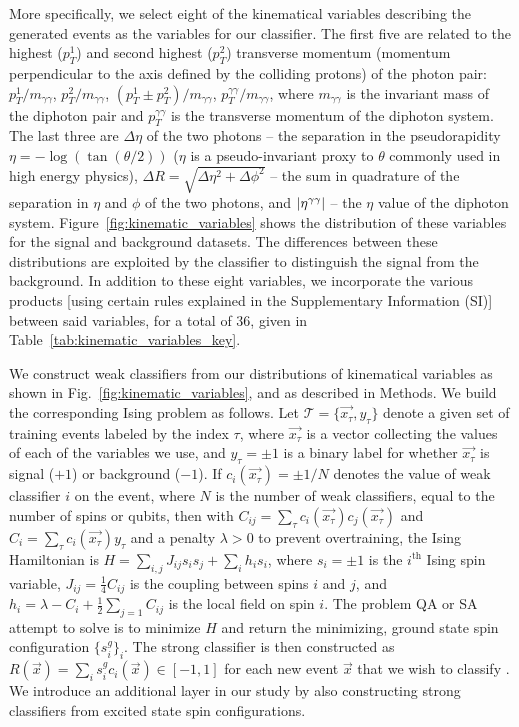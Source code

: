 \documentclass[fleqn,10pt]{wlscirep}
\newcommand{\mc}{\mathcal}
\begin{document}
More specifically, we select eight of the kinematical variables describing the generated events as the variables for our classifier. The first five are related to the highest ($p_T^1$) and second highest ($p_T^2$) transverse momentum (momentum perpendicular to the axis defined by the colliding protons) of the photon pair: 
 $p_T^1/m_{\gamma\gamma}$, $p_T^2/m_{\gamma\gamma}$, $(p_T^1\pm p_T^2)/m_{\gamma\gamma}$, $p_T^{\gamma\gamma}/m_{\gamma\gamma}$, where $m_{\gamma\gamma}$ is the invariant mass of the diphoton pair and $p_T^{\gamma\gamma}$ is the transverse momentum of the diphoton system. The last three are $\Delta\eta$ of the two photons -- the separation in the pseudorapidity  $\eta = -\log(\tan(\theta/2))$ ($\eta$ is a pseudo-invariant proxy to $\theta$ commonly used in high energy physics), $\Delta R = \sqrt{\Delta\eta^2+\Delta\phi^2}$ -- the sum in quadrature of the separation in $\eta$ and $\phi$ of the two photons, and $\abs{\eta^{\gamma\gamma}}$ -- the $\eta$ value of the diphoton system.
Figure~\ref{fig:kinematic_variables} shows the distribution of these variables for the signal and background datasets. The differences between these distributions are exploited by the classifier  to distinguish the signal from the background. In addition to these eight variables, we incorporate the various products [using certain rules explained in the Supplementary Information (SI)] between said variables, for a total of $36$, given in Table~\ref{tab:kinematic_variables_key}.
 

We construct weak classifiers from our distributions of kinematical variables as shown in Fig.~\ref{fig:kinematic_variables}, and as described in Methods. We build the corresponding Ising problem as follows\cite{Pudenz:2013kx}. Let $\mc{T} = \{\vec{x_\tau}, y_\tau\}$ denote a given set of training events labeled by the index ${\tau}$, where $\vec{x_\tau}$ is a vector collecting the values of each of the variables we use, and $y_\tau =\pm 1$ is a binary label for whether $\vec{x_\tau}$ is signal ($+1$) or background ($-1$).  If $c_i(\vec{x_\tau})=\pm 1/N$ denotes the value of weak classifier $i$ on the event, where $N$ is the number of weak classifiers, equal to the number of spins or qubits, then with $C_{ij} = \sum_\tau c_i(\vec{x_\tau})c_j(\vec{x_\tau})$ and $C_i = \sum_\tau c_i(\vec{x_\tau}) y_\tau$ and a penalty $\lambda>0$ to prevent overtraining, the Ising Hamiltonian is $H = \sum_{i,j} J_{ij} s_i s_j + \sum_i h_i  s_i$, where $s_i=\pm 1$ is the $i^\textrm{th}$ Ising spin variable, $J_{ij} = \frac{1}{4} C_{ij}$ is the coupling between spins $i$ and $j$, and $h_i =  \lambda-C_i+\frac{1}{2}\sum_{j=1} C_{ij}$ is the local field on spin $i$. The problem QA or SA attempt to solve is to minimize $H$ and return the minimizing, ground state spin configuration $\{s^g_i\}_i$. The strong classifier is then constructed as $R(\vec{x}) = \sum_i s^g_i c_i(\vec{x})\in[-1,1]$ for each new event $\vec{x}$ that we wish to classify \cite{Pudenz:2013kx}. We introduce an additional layer in our study by also constructing strong classifiers from excited state spin configurations.
\end{document}
